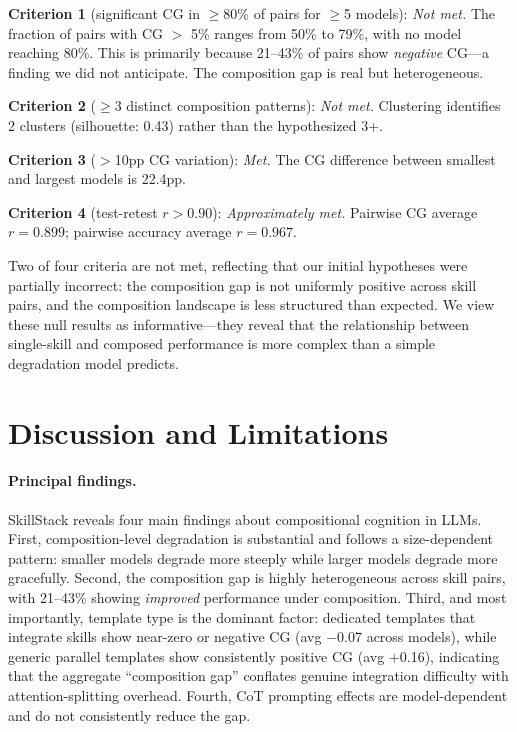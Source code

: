 \documentclass{article}
\begin{document}
\textbf{Criterion 1} (significant CG in $\geq$80\% of pairs for $\geq$5 models): \emph{Not met.} The fraction of pairs with CG $>$ 5\% ranges from 50\% to 79\%, with no model reaching 80\%. This is primarily because 21--43\% of pairs show \emph{negative} CG---a finding we did not anticipate. The composition gap is real but heterogeneous.

\textbf{Criterion 2} ($\geq$3 distinct composition patterns): \emph{Not met.} Clustering identifies 2 clusters (silhouette: 0.43) rather than the hypothesized 3+.

\textbf{Criterion 3} ($>$10pp CG variation): \emph{Met.} The CG difference between smallest and largest models is 22.4pp.

\textbf{Criterion 4} (test-retest $r > 0.90$): \emph{Approximately met.} Pairwise CG average $r = 0.899$; pairwise accuracy average $r = 0.967$.

Two of four criteria are not met, reflecting that our initial hypotheses were partially incorrect: the composition gap is not uniformly positive across skill pairs, and the composition landscape is less structured than expected. We view these null results as informative---they reveal that the relationship between single-skill and composed performance is more complex than a simple degradation model predicts.

\section{Discussion and Limitations}
\label{sec:discussion}

\paragraph{Principal findings.} SkillStack reveals four main findings about compositional cognition in LLMs. First, composition-level degradation is substantial and follows a size-dependent pattern: smaller models degrade more steeply while larger models degrade more gracefully. Second, the composition gap is highly heterogeneous across skill pairs, with 21--43\% showing \emph{improved} performance under composition. Third, and most importantly, template type is the dominant factor: dedicated templates that integrate skills show near-zero or negative CG (avg $-$0.07 across models), while generic parallel templates show consistently positive CG (avg $+$0.16), indicating that the aggregate ``composition gap'' conflates genuine integration difficulty with attention-splitting overhead. Fourth, CoT prompting effects are model-dependent and do not consistently reduce the gap.
\end{document}
